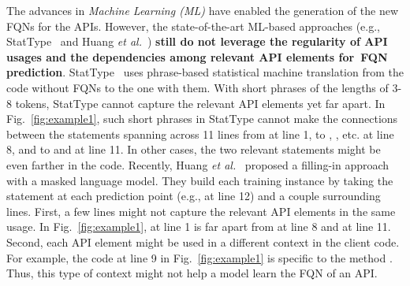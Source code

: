 The advances in {\em Machine Learning (ML)} have enabled the
generation of the new FQNs for the APIs. However, the state-of-the-art
ML-based approaches (e.g., StatType~\cite{icse18} and Huang {\em et
  al.}~\cite{prompt-ase22}) {\bf still do not leverage the regularity
  of API usages and the dependencies among relevant API elements
  for~FQN prediction}. StatType~\cite{icse18} uses phrase-based
statistical machine translation from the code without FQNs to the one
with them.  With short phrases of the lengths of 3-8 tokens, StatType
cannot capture the relevant API elements yet far apart. In
Fig.~\ref{fig:example1}, such short phrases in StatType cannot make
the connections between the statements spanning across 11 lines from
 at line 1, to ,
, etc. at line 8, and to  and
 at line 11. In other cases, the two relevant
statements might be even farther in the code.
%
Recently, Huang {\em et al.}~\cite{prompt-ase22} proposed a filling-in
approach with a masked language model. They build each training
instance by taking the statement at each prediction point (e.g.,
 at line 12) and a couple surrounding lines.
%
First, a few lines might not capture the relevant API elements in the
same usage. In Fig.~\ref{fig:example1},  at line 1 is
far apart from  at line 8 and  at line
11. Second, each API element might be used in a different context in
the client code. For example, the code at line 9 in
Fig.~\ref{fig:example1} is specific to the method
. Thus, this type of context might not help a model
learn the FQN of an API.


